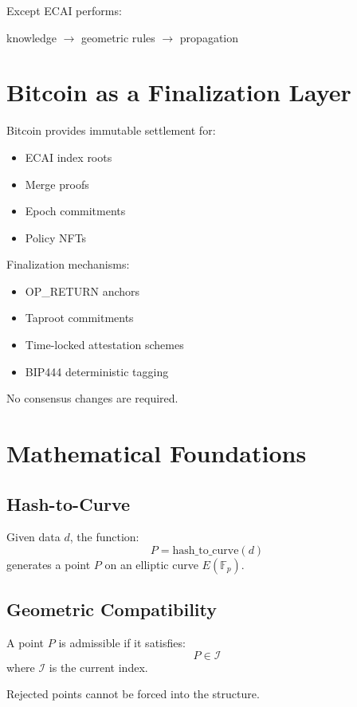\documentclass[11pt]{article}
\begin{document}
Except ECAI performs:
\begin{center}
knowledge $\rightarrow$ geometric rules $\rightarrow$ propagation
\end{center}

\section{Bitcoin as a Finalization Layer}

Bitcoin provides immutable settlement for:
\begin{itemize}[noitemsep]
    \item ECAI index roots
    \item Merge proofs
    \item Epoch commitments
    \item Policy NFTs
\end{itemize}

Finalization mechanisms:
\begin{itemize}[noitemsep]
    \item OP\_RETURN anchors
    \item Taproot commitments
    \item Time-locked attestation schemes
    \item BIP444 deterministic tagging
\end{itemize}

No consensus changes are required.

\section{Mathematical Foundations}

\subsection{Hash-to-Curve}
Given data $d$, the function:
\[
    P = \text{hash\_to\_curve}(d)
\]
generates a point $P$ on an elliptic curve $E(\mathbb{F}_p)$.

\subsection{Geometric Compatibility}
A point $P$ is admissible if it satisfies:
\[
    P \in \mathcal{I}
\]
where $\mathcal{I}$ is the current index.

Rejected points cannot be forced into the structure.
\end{document}
